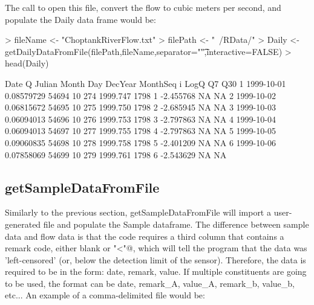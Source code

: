 \documentclass[a4paper,11pt]{article}
\begin{document}
The call to open this file, convert the flow to cubic meters per second, and populate the Daily data frame would be:
\begin{Schunk}
\begin{Sinput}
> fileName <- "ChoptankRiverFlow.txt"
> filePath <-  "~/RData/"
> Daily <- getDailyDataFromFile(filePath,fileName,separator="\t",interactive=FALSE)
> head(Daily)
\end{Sinput}
\begin{Soutput}
        Date          Q Julian Month Day  DecYear MonthSeq i      LogQ Q7 Q30
1 1999-10-01 0.08579729  54694    10 274 1999.747     1798 1 -2.455768 NA  NA
2 1999-10-02 0.06815672  54695    10 275 1999.750     1798 2 -2.685945 NA  NA
3 1999-10-03 0.06094013  54696    10 276 1999.753     1798 3 -2.797863 NA  NA
4 1999-10-04 0.06094013  54697    10 277 1999.755     1798 4 -2.797863 NA  NA
5 1999-10-05 0.09060835  54698    10 278 1999.758     1798 5 -2.401209 NA  NA
6 1999-10-06 0.07858069  54699    10 279 1999.761     1798 6 -2.543629 NA  NA
\end{Soutput}
\end{Schunk}

\subsection{getSampleDataFromFile}
Similarly to the previous section, getSampleDataFromFile will import a user-generated file and populate the Sample dataframe. The difference between sample data and flow data is that the code requires a third column that contains a remark code, either blank or \verb@"<"@, which will tell the program that the data was 'left-censored' (or, below the detection limit of the sensor). Therefore, the data is required to be in the form: date, remark, value.  If multiple constituents are going to be used, the format can be date, remark\_A, value\_A, remark\_b, value\_b, etc... An example of a comma-delimited file would be:
\end{document}
